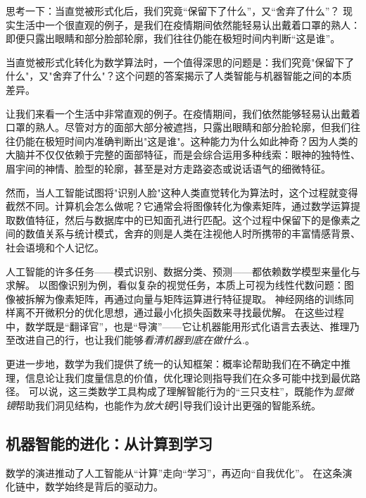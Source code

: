 思考一下：当直觉被形式化后，我们究竟“保留下了什么”，又“舍弃了什么”？  
现实生活中一个很直观的例子，是我们在疫情期间依然能轻易认出戴着口罩的熟人：即便只露出眼睛和部分脸部轮廓，我们往往仍能在极短时间内判断“这是谁”。  

当直觉被形式化转化为数学算法时，一个值得深思的问题是：我们究竟"保留下了什么"，又"舍弃了什么"？这个问题的答案揭示了人类智能与机器智能之间的本质差异。

让我们来看一个生活中非常直观的例子。在疫情期间，我们依然能够轻易认出戴着口罩的熟人。尽管对方的面部大部分被遮挡，只露出眼睛和部分脸轮廓，但我们往往仍能在极短时间内准确判断出"这是谁"。这种能力为什么如此神奇？因为人类的大脑并不仅仅依赖于完整的面部特征，而是会综合运用多种线索：眼神的独特性、眉宇间的神情、脸型的轮廓，甚至是对方走路姿态或说话语气的细微特征。

然而，当人工智能试图将"识别人脸"这种人类直觉转化为算法时，这个过程就变得截然不同。计算机会怎么做呢？它通常会将图像转化为像素矩阵，通过数学运算提取数值特征，然后与数据库中的已知面孔进行匹配。这个过程中保留下的是像素之间的数值关系与统计模式，舍弃的则是人类在注视他人时所携带的丰富情感背景、社会语境和个人记忆。


人工智能的许多任务——模式识别、数据分类、预测——都依赖数学模型来量化与求解。
以图像识别为例，看似复杂的视觉任务，本质上可视为线性代数问题：图像被拆解为像素矩阵，再通过向量与矩阵运算进行特征提取。
神经网络的训练同样离不开微积分的优化思想，通过最小化损失函数来寻找最优解。
在这些过程中，数学既是“翻译官”，也是“导演”——它让机器能用形式化语言去表达、推理乃至改进自己的行，也让我们能够\emph{看清机器到底在做什么}.。

更进一步地，数学为我们提供了统一的认知框架：概率论帮助我们在不确定中推理，信息论让我们度量信息的价值，优化理论则指导我们在众多可能中找到最优路径。
可以说，这三类数学工具构成了理解智能行为的“三只支柱”，既能作为\emph{显微镜}帮助我们洞见结构，也能作为\emph{放大镜}引导我们设计出更强的智能系统。  

\subsection{机器智能的进化：从计算到学习}
数学的演进推动了人工智能从“计算”走向“学习”，再迈向“自我优化”。
在这条演化链中，数学始终是背后的驱动力。

